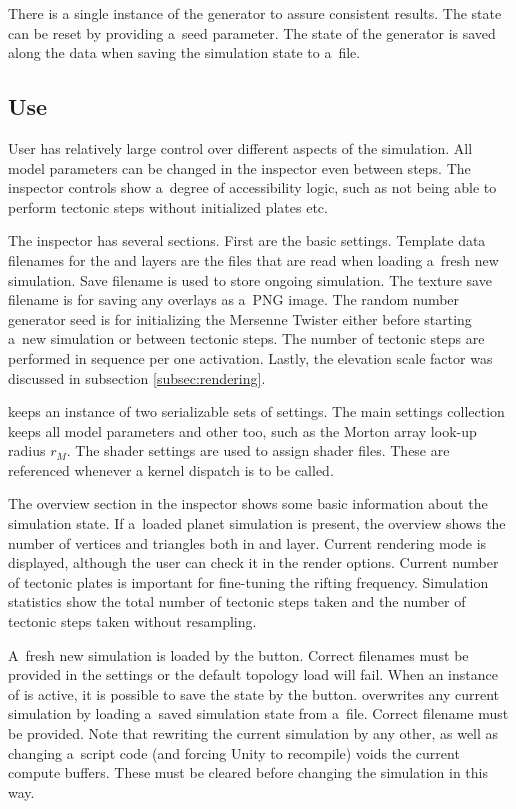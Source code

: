 There is a single instance of the generator to assure consistent results. The state can be reset by providing a~seed parameter. The state of the generator is saved along the data when saving the simulation state to a~file.
\subsection{Use}
User has relatively large control over different aspects of the simulation. All model parameters can be changed in the inspector even between steps. The inspector controls show a~degree of accessibility logic, such as not being able to perform tectonic steps without initialized plates etc.

The inspector has several sections. First are the basic settings. Template data filenames for the  and  layers are the files that are read when loading a~fresh new simulation. Save filename is used to store ongoing simulation. The texture save filename is for saving any overlays as a~PNG image. The random number generator seed is for initializing the Mersenne Twister either before starting a~new simulation or between tectonic steps. The number of tectonic steps are performed in sequence per one activation. Lastly, the elevation scale factor was discussed in subsection \ref{subsec:rendering}.

 keeps an instance of two serializable sets of settings. The main settings collection  keeps all model parameters and other too, such as the Morton array look-up radius $r_M$. The shader settings are used to assign shader files. These are referenced whenever a kernel dispatch is to be called.

The overview section in the inspector shows some basic information about the simulation state. If a~loaded planet simulation is present, the overview shows the number of vertices and triangles both in  and  layer. Current rendering mode is displayed, although the user can check it in the render options. Current number of tectonic plates is important for fine-tuning the rifting frequency. Simulation statistics show the total number of tectonic steps taken and the number of tectonic steps taken without resampling.

A~fresh new simulation is loaded by the  button. Correct filenames must be provided in the settings or the default topology load will fail. When an instance of  is active, it is possible to save the state by the  button.  overwrites any current simulation by loading a~saved simulation state from a~file. Correct filename must be provided. Note that rewriting the current simulation by any other, as well as changing a~script code (and forcing Unity to recompile) voids the current compute buffers. These must be cleared before changing the simulation in this way.

